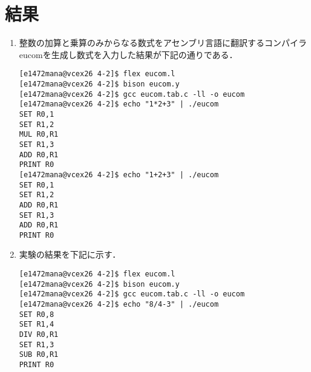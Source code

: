 \documentclass[a4j]{jsarticle}  %
\begin{document}
\section{結果}
\begin{enumerate}
\item 整数の加算と乗算のみからなる数式をアセンブリ言語に翻訳するコンパイラeucomを生成し数式を入力した結果が下記の通りである．
\begin{screen}
\begin{verbatim}
[e1472mana@vcex26 4-2]$ flex eucom.l
[e1472mana@vcex26 4-2]$ bison eucom.y
[e1472mana@vcex26 4-2]$ gcc eucom.tab.c -ll -o eucom
[e1472mana@vcex26 4-2]$ echo "1*2+3" | ./eucom
SET R0,1
SET R1,2
MUL R0,R1
SET R1,3
ADD R0,R1
PRINT R0
[e1472mana@vcex26 4-2]$ echo "1+2+3" | ./eucom
SET R0,1
SET R1,2
ADD R0,R1
SET R1,3
ADD R0,R1
PRINT R0
\end{verbatim}
\end{screen}

\item 実験の結果を下記に示す．
\begin{screen}
\begin{verbatim}
[e1472mana@vcex26 4-2]$ flex eucom.l
[e1472mana@vcex26 4-2]$ bison eucom.y
[e1472mana@vcex26 4-2]$ gcc eucom.tab.c -ll -o eucom
[e1472mana@vcex26 4-2]$ echo "8/4-3" | ./eucom
SET R0,8
SET R1,4
DIV R0,R1
SET R1,3
SUB R0,R1
PRINT R0
\end{verbatim}
\end{screen}
\end{enumerate}
\end{document}

